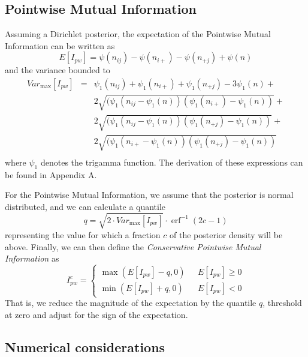 \documentclass[conference]{IEEEtran}
\newcommand{\digamma}{\psi}
\newcommand{\trigamma}{\psi_1}
\DeclareMathOperator\erf{erf}
\begin{document}
\subsection{Pointwise Mutual Information}

Assuming a Dirichlet posterior, the expectation of the Pointwise Mutual Information can be written as
\begin{equation}
\label{eq:pwmiexp}
E[I_{pw}] = \digamma(n_{ij}) - \digamma(n_{i+}) - \digamma(n_{+j}) + \digamma(n)
\end{equation}
and the variance bounded to
\begin{eqnarray}
Var_{\max}[I_{pw}] & = & \trigamma(n_{ij}) + \trigamma(n_{i+}) + \trigamma(n_{+j}) - 3 \trigamma(n) + \nonumber \\
&& 2 \sqrt{(\trigamma(n_{ij} - \trigamma(n))(\trigamma(n_{i+}) - \trigamma(n))} + \nonumber \\
&& 2 \sqrt{(\trigamma(n_{ij} - \trigamma(n))(\trigamma(n_{+j}) - \trigamma(n))} + \nonumber \\
&& 2 \sqrt{(\trigamma(n_{i+} - \trigamma(n))(\trigamma(n_{+j}) - \trigamma(n))} \nonumber \\
\label{eq:pwmivarmax}
\end{eqnarray}
where $\trigamma$ denotes the trigamma function. The derivation of these expressions can be found in Appendix A.

For the Pointwise Mutual Information, we assume that the posterior is normal distributed, and we can calculate a quantile
\begin{equation}
q = \sqrt{2 \cdot Var_{\max}[I_{pw}]} \cdot \erf^{-1}(2c - 1)
\end{equation}
representing the value for which a fraction $c$ of the posterior density will be above.
Finally, we can then define the \emph{Conservative Pointwise Mutual Information} as
\begin{equation}
I^c_{pw} = \left\{ \begin{array}{rl}
\max(E[I_{pw}] - q, 0) &\mbox{ $E[I_{pw}] \geq 0$} \\
\min(E[I_{pw}] + q, 0) &\mbox{ $E[I_{pw}] < 0$}
\end{array} \right.
\end{equation}
That is, we reduce the magnitude of the expectation by the quantile $q$, threshold at zero and adjust for the sign of the expectation.

\subsection{Numerical considerations}
\end{document}
